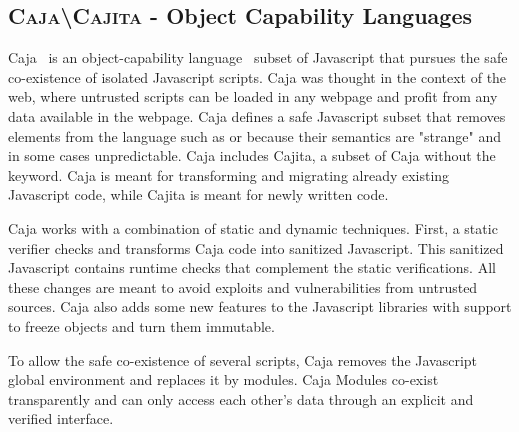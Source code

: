 \subsection*{\textsc{Caja\textbackslash Cajita} - Object Capability Languages}

Caja~\cite{Mill08a} is an object-capability language~\cite{Levy84a,Mill03a,Spoo00a} subset of Javascript that pursues the safe co-existence of isolated Javascript scripts. Caja was thought in the context of the web, where untrusted scripts can be loaded in any webpage and profit from any data available in the webpage. Caja defines a safe Javascript subset that removes elements from the language such as  or  because their semantics are "strange" and in some cases unpredictable. Caja includes Cajita, a subset of Caja without the  keyword. Caja is meant for transforming and migrating already existing Javascript code, while Cajita is meant for newly written code.

Caja works with a combination of static and dynamic techniques. First, a static verifier checks and transforms Caja code into sanitized Javascript. This sanitized Javascript contains runtime checks that complement the static verifications. All these changes are meant to avoid exploits and vulnerabilities from untrusted sources. Caja also adds some new features to the Javascript libraries with support to freeze objects and turn them immutable. 

To allow the safe co-existence of several scripts, Caja removes the Javascript global environment and replaces it by modules. Caja Modules co-exist transparently and can only access each other's data through an explicit and verified interface.
%


